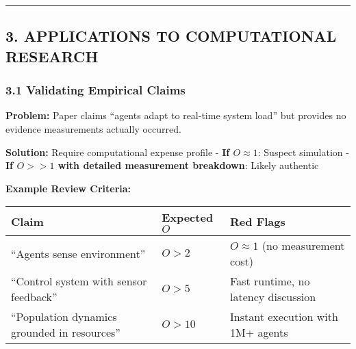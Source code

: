 \documentclass[
]{article}
\newcounter{none} %
\begin{document}
\begin{center}\rule{0.5\linewidth}{0.5pt}\end{center}

\subsection{3. APPLICATIONS TO COMPUTATIONAL
RESEARCH}\label{applications-to-computational-research}

\subsubsection{3.1 Validating Empirical
Claims}\label{validating-empirical-claims}

\textbf{Problem:} Paper claims ``agents adapt to real-time system load''
but provides no evidence measurements actually occurred.

\textbf{Solution:} Require computational expense profile - \textbf{If
\(O \approx 1\)}: Suspect simulation - \textbf{If \(O >> 1\) with
detailed measurement breakdown}: Likely authentic

\textbf{Example Review Criteria:}

{\def\LTcaptype{none} %
\begin{longtable}[]{@{}
  >{\raggedright\arraybackslash}p{}
  >{\raggedright\arraybackslash}p{}
  >{\raggedright\arraybackslash}p{}@{}}
\toprule\noalign{}
\begin{minipage}[b]{\linewidth}\raggedright
Claim
\end{minipage} & \begin{minipage}[b]{\linewidth}\raggedright
Expected \(O\)
\end{minipage} & \begin{minipage}[b]{\linewidth}\raggedright
Red Flags
\end{minipage} \\
\midrule\noalign{}
\endhead
\bottomrule\noalign{}
\endlastfoot
``Agents sense environment'' & \(O > 2\) & \(O \approx 1\) (no
measurement cost) \\
``Control system with sensor feedback'' & \(O > 5\) & Fast runtime, no
latency discussion \\
``Population dynamics grounded in resources'' & \(O > 10\) & Instant
execution with 1M+ agents \\
\end{longtable}
}
\end{document}
